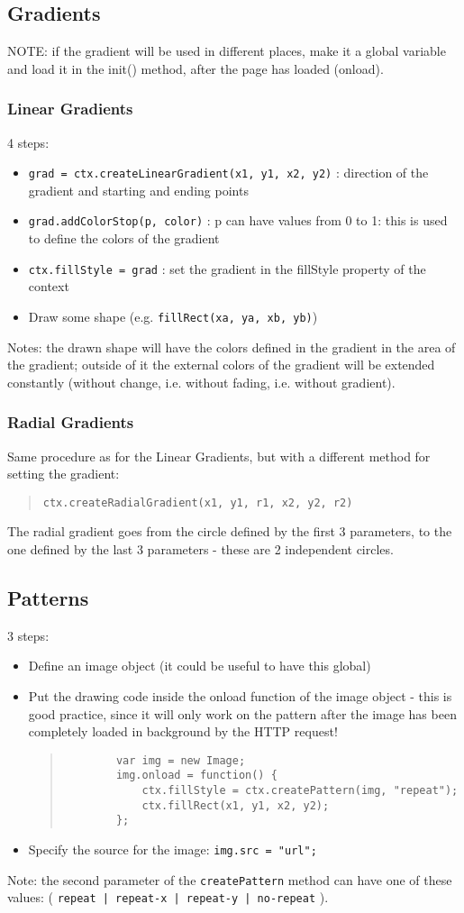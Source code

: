 \documentclass[a4paper,11pt]{book}
\begin{document}
\subsection{Gradients}
NOTE: if the gradient will be used in different places, make it a global variable and load it in the init() method,
after the page has loaded (onload).
\subsubsection{Linear Gradients}
4 steps:
\begin{itemize}
\item \texttt{grad = ctx.createLinearGradient(x1, y1, x2, y2)} : direction of the gradient and starting and ending points
\item \texttt{grad.addColorStop(p, color)} : p can have values from 0 to 1: this is used to define the colors of the gradient
\item \texttt{ctx.fillStyle = grad} : set the gradient in the fillStyle property of the context
\item Draw some shape (e.g. \texttt{fillRect(xa, ya, xb, yb)})
\end{itemize}
Notes: the drawn shape will have the colors defined in the gradient in the area of the gradient; outside of it
the external colors of the gradient will be extended constantly (without change, i.e. without fading, i.e. without gradient).
\subsubsection{Radial Gradients}
Same procedure as for the Linear Gradients, but with a different method
for setting the gradient:
\begin{verse}
\texttt{ctx.createRadialGradient(x1, y1, r1, x2, y2, r2)} \end{verse}
The radial gradient goes from the circle defined by the first
3 parameters, to the one defined by the last 3 parameters - these are 2 independent circles.

\subsection{Patterns}
3 steps:
\begin{itemize}
\item Define an image object (it could be useful to have this global)
\item Put the drawing code inside the onload function of the image object - this is good practice, since it will only
		work on the pattern after the image has been completely loaded in background by the HTTP request!
		\begin{verse}
		\begin{verbatim}
		var img = new Image;
		img.onload = function() {
			ctx.fillStyle = ctx.createPattern(img, "repeat");
			ctx.fillRect(x1, y1, x2, y2);
		};
		\end{verbatim}
		\end{verse}
\item Specify the source for the image: \texttt{img.src = "url";}
\end{itemize}
Note: the second parameter of the \texttt{createPattern} method can have one of these values: (
\texttt{repeat | repeat-x | repeat-y | no-repeat} ).
\end{document}
